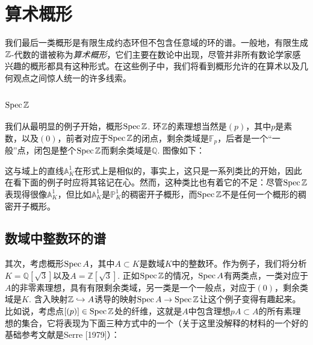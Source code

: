 \section{算术概形} \label{s:2.4}

我们最后一类概形是有限生成约态环但不包含任意域的环的谱。一般地，有限生成$\mathbb{Z}$\hyp 代数的谱被称为\textit{算术概形}，它们主要在数论中出现，尽管并非所有数论学家感兴趣的概形都具有这种形式。在这些例子中，我们将看到概形允许的在算术以及几何观点之间惊人统一的许多线索。

\subsection{\texorpdfstring{$\operatorname{Spec} \mathbb{Z}$}{Spec Z}} \label{s:2.4.1}

我们从最明显的例子开始，概形$\operatorname{Spec} \mathbb{Z}$. 环$\mathbb{Z}$的素理想当然是$(p)$，其中$p$是素数，以及$(0)$，前者对应于$\operatorname{Spec} \mathbb{Z}$的闭点，剩余类域是$\mathbb{F}_p$，后者是一个“一般”点，闭包是整个$\operatorname{Spec} \mathbb{Z}$而剩余类域是$\mathbb{Q}$. 图像如下：


\noindent 这与域上的直线$\mathbb{A}_K^1$在形式上是相似的，事实上，这只是一系列类比的开始，因此在看下面的例子时应将其铭记在心。然而，这种类比也有着它的不足：尽管$\operatorname{Spec} \mathbb{Z}$表现得很像$\mathbb{A}_K^1$，但比如$\mathbb{A}_K^1$是$\mathbb{P}_K^1$的稠密开子概形，而$\operatorname{Spec} \mathbb{Z}$不是任何一个概形的稠密开子概形。

\subsection{数域中整数环的谱} \label{s:2.4.2}

其次，考虑概形$\operatorname{Spec} A$，其中$A\subset K$是数域$K$中的整数环。作为例子，我们将分析$K=\mathbb{Q}[\sqrt{3}]$以及$A=\mathbb{Z}[\sqrt{3}]$. 正如$\operatorname{Spec} \mathbb{Z}$的情况，$\operatorname{Spec} A$有两类点，一类对应于$A$的非零素理想，具有有限剩余类域，另一类是一个一般点，对应于$(0)$，剩余类域是$K$. 含入映射$\mathbb{Z}\hookrightarrow A$诱导的映射$\operatorname{Spec} A\to \operatorname{Spec} \mathbb{Z}$让这个例子变得有趣起来。比如说，考虑点$[(p)]\in \operatorname{Spec} \mathbb{Z}$处的纤维，这就是$A$中包含理想$pA\subset A$的所有素理想的集合，它将表现为下面三种方式中的一个（关于这里没解释的材料的一个好的基础参考文献是Serre [1979]）：

